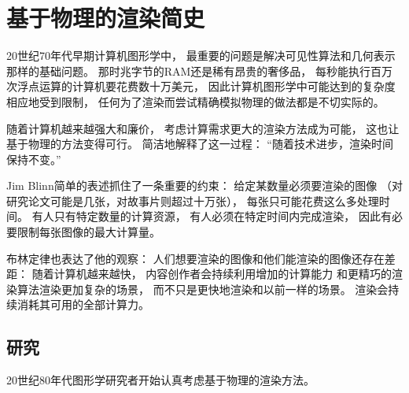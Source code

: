 \section{基于物理的渲染简史}\label{sec:基于物理的渲染简史}

20世纪70年代早期计算机图形学中，
最重要的问题是解决可见性算法和几何表示那样的基础问题。
那时兆字节的RAM还是稀有昂贵的奢侈品，
每秒能执行百万次浮点运算的计算机要花费数十万美元，
因此计算机图形学中可能达到的复杂度相应地受到限制，
任何为了渲染而尝试精确模拟物理的做法都是不切实际的。

随着计算机越来越强大和廉价，
考虑计算需求更大的渲染方法成为可能，
这也让基于物理的方法变得可行。
简洁地解释了这一过程：
“随着技术进步，渲染时间保持不变。”

Jim Blinn简单的表述抓住了一条重要的约束：
给定某数量必须要渲染的图像
（对研究论文可能是几张，对故事片则超过十万张），
每张只可能花费这么多处理时间。
有人只有特定数量的计算资源，
有人必须在特定时间内完成渲染，
因此有必要限制每张图像的最大计算量。

布林定律也表达了他的观察：
人们想要渲染的图像和他们能渲染的图像还存在差距：
随着计算机越来越快，
内容创作者会持续利用增加的计算能力
和更精巧的渲染算法渲染更加复杂的场景，
而不只是更快地渲染和以前一样的场景。
渲染会持续消耗其可用的全部计算力。

\subsection{研究}\label{sub:研究}
20世纪80年代图形学研究者开始认真考虑基于物理的渲染方法。
